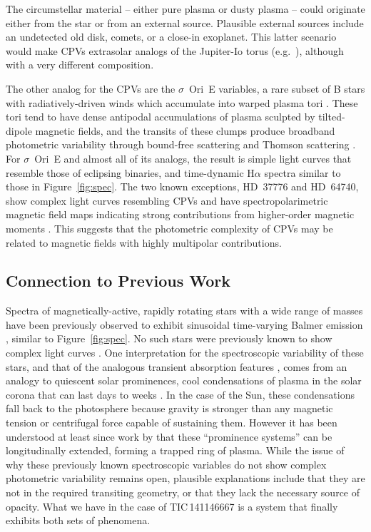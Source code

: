 \documentclass[11pt,twocolumn,tighten,linenumbers]{aastex7}
\begin{document}
The circumstellar material -- either pure plasma or dusty plasma --
could originate either from the star or from an external source.
Plausible external sources include an undetected old disk, comets, or a
close-in exoplanet.  This latter scenario would make CPVs extrasolar
analogs of the Jupiter-Io torus (e.g.~\citealt{Bagenal1981}),
although with a very different composition.

The other analog for the CPVs are the $\sigma$~Ori~E variables, a rare
subset of B stars with radiatively-driven winds which accumulate into
warped plasma tori \citep{Townsend2005,Townsend2008}.  These tori tend
to have dense antipodal accumulations of plasma sculpted by
tilted-dipole magnetic fields, and the transits of these clumps produce
broadband photometric variability through bound-free scattering
\citep{Townsend2005} and Thomson scattering \citep{Berry2022}.  For
$\sigma$~Ori~E and almost all of its analogs, the result is simple
light curves that resemble those of eclipsing binaries, and time-dynamic
H$\alpha$ spectra similar to those in Figure~\ref{fig:spec}.  The two
known exceptions, HD~37776 and HD~64740, show complex light curves
resembling CPVs \citep{Mikulasek2020,Bouma2024} and have
spectropolarimetric magnetic field maps indicating strong contributions
from higher-order magnetic moments \citep{Kochukhov2011,Shultz2018}.
This suggests that the photometric complexity of CPVs may be related to
magnetic fields with highly multipolar contributions.  


\subsection{Connection to Previous Work}

Spectra of magnetically-active, rapidly rotating stars with a wide range
of masses have been previously observed to exhibit sinusoidal
time-varying Balmer emission
\citep{Donati2000,Townsend2005,Dunstone2006,Skelly2008}, similar to 
Figure~\ref{fig:spec}.  No such stars were previously known to show
complex light curves \citep{Bouma2024}.   One interpretation for the
spectroscopic variability of these stars, and that of the analogous
transient absorption features
\citep{CollierCameron1989,CollierCameron1992,Cang2020}, comes from an
analogy to quiescent solar prominences, cool condensations of plasma in
the solar corona that can last days to weeks \citep{VialEngvold2015}.
In the case of the Sun, these condensations fall back to the photosphere
because gravity is stronger than any magnetic tension or centrifugal
force capable of sustaining them.  However it has been understood at
least since work by \citet{Donati2000} that these ``prominence systems''
can be longitudinally extended, forming a trapped ring of plasma.  While
the issue of why these previously known spectroscopic variables do
not show complex photometric variability remains open, plausible
explanations include that they are not in the required transiting
geometry, or that they lack the necessary source of opacity.  What we
have in the case of TIC\,141146667 is a system that finally exhibits
both sets of phenomena.
\end{document}
